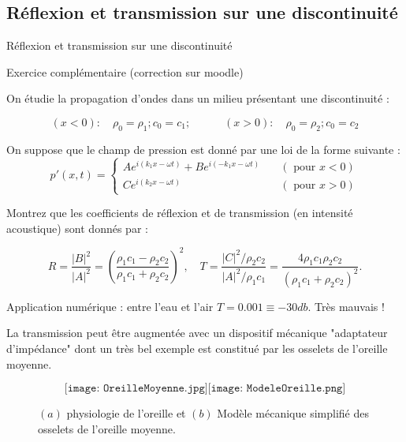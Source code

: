 \subsection{Réflexion et transmission sur une discontinuité}
\begin{frame}{Réflexion et transmission sur une discontinuité}

\small

Exercice complémentaire (correction sur moodle)

On étudie la propagation d'ondes dans un milieu présentant une discontinuité :

$$
(x<0 ) : \quad \rho_0 = \rho_1 ; c_0 = c_1 ; \quad \qquad (x>0 ) : \quad  \rho_0 = \rho_2 ; c_0 = c_2
$$

On suppose que le champ de pression est donné par une loi de la forme suivante :
\begin{equation}
p'(x,t) = \left\{ \begin{array}{ll} 
A e^{i (k_1 x - \omega t)} + B e^{i (-k_1 x - \omega t)} & \quad ( \mbox{ pour }  x<0) \\
C e^{i (k_2 x - \omega t)} & \quad ( \mbox{ pour }  x>0) 
\end{array}
\right.
\label{eq:ABC}
\end{equation}


Montrez que les coefficients de réflexion et de transmission (en intensité acoustique) sont donnés par :

\begin{equation}
R = \frac{|B|^2}{|A|^2} = \left(\frac{\rho_1 c_1 - \rho_2 c_2}{\rho_1 c_1 + \rho_2 c_2}\right)^2,
\quad
T = \frac{|C|^2/\rho_2 c_2}{|A|^2/ \rho_1 c_1}    = \frac{4 \rho_1 c_1\rho_2 c_2}{(\rho_1 c_1 + \rho_2 c_2)^2}.
\label{eq:RT}
\end{equation}

Application numérique : entre l'eau et l'air $T = 0.001  \equiv -30 db$. Très mauvais !

La transmission peut être augmentée avec un dispositif mécanique "adaptateur d'impédance" dont un très bel exemple est constitué par les osselets de l'oreille moyenne.

\begin{figure}
$$
\texttt{[image: OreilleMoyenne.jpg]}
\texttt{[image: ModeleOreille.png]}
$$
\caption{$(a)$ physiologie de l'oreille et $(b)$ Modèle mécanique simplifié des osselets de l'oreille moyenne.}
\end{figure}


\end{frame}



